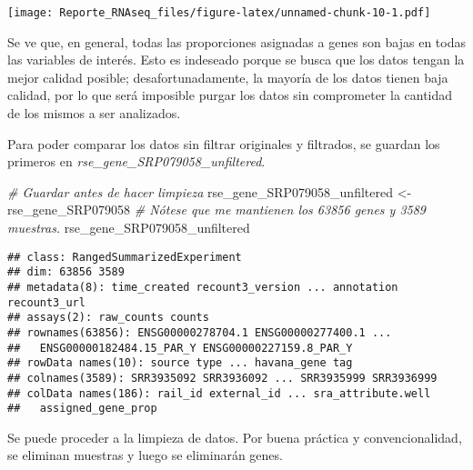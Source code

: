 \documentclass[
]{article}
\newenvironment{Shaded}{\begin{snugshade}}{\end{snugshade}}
\newcommand{\CommentTok}[1]{\textcolor[rgb]{0.56,0.35,0.01}{\textit{#1}}}
\newcommand{\FunctionTok}[1]{\textcolor[rgb]{0.00,0.00,0.00}{#1}}
\newcommand{\NormalTok}[1]{#1}
\newcommand{\OtherTok}[1]{\textcolor[rgb]{0.56,0.35,0.01}{#1}}
\newcommand{\SpecialCharTok}[1]{\textcolor[rgb]{0.00,0.00,0.00}{#1}}
\begin{document}
\texttt{[image: Reporte\_RNAseq\_files/figure-latex/unnamed-chunk-10-1.pdf]}

Se ve que, en general, todas las proporciones asignadas a genes son
bajas en todas las variables de interés. Esto es indeseado porque se
busca que los datos tengan la mejor calidad posible; desafortunadamente,
la mayoría de los datos tienen baja calidad, por lo que será imposible
purgar los datos sin comprometer la cantidad de los mismos a ser
analizados.

Para poder comparar los datos sin filtrar originales y filtrados, se
guardan los primeros en \emph{rse\_gene\_SRP079058\_unfiltered}.

\begin{Shaded}
\begin{Highlighting}[]
\CommentTok{\# Guardar antes de hacer limpieza}
\NormalTok{rse\_gene\_SRP079058\_unfiltered }\OtherTok{\textless{}{-}}\NormalTok{ rse\_gene\_SRP079058}
\CommentTok{\# Nótese que me mantienen los 63856 genes y 3589 muestras.}
\NormalTok{rse\_gene\_SRP079058\_unfiltered}
\end{Highlighting}
\end{Shaded}

\begin{verbatim}
## class: RangedSummarizedExperiment 
## dim: 63856 3589 
## metadata(8): time_created recount3_version ... annotation recount3_url
## assays(2): raw_counts counts
## rownames(63856): ENSG00000278704.1 ENSG00000277400.1 ...
##   ENSG00000182484.15_PAR_Y ENSG00000227159.8_PAR_Y
## rowData names(10): source type ... havana_gene tag
## colnames(3589): SRR3935092 SRR3936092 ... SRR3935999 SRR3936999
## colData names(186): rail_id external_id ... sra_attribute.well
##   assigned_gene_prop
\end{verbatim}

Se puede proceder a la limpieza de datos. Por buena práctica y
convencionalidad, se eliminan muestras y luego se eliminarán genes.

\begin{Shaded}
\end{Shaded}
\end{document}

